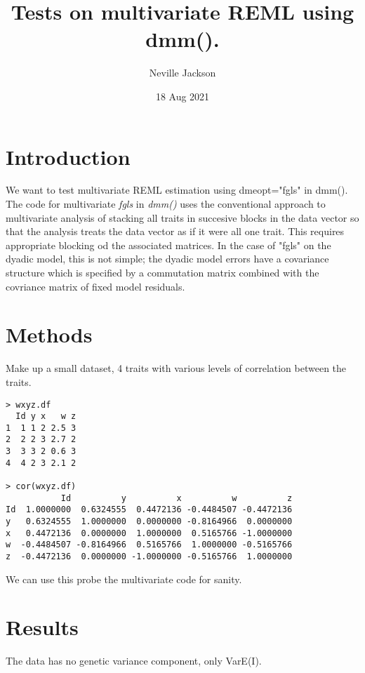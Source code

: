 \documentclass{report}  %
\title{ Tests on multivariate REML using dmm().}
\author{Neville Jackson }
\date{18 Aug 2021 }
\begin{document}
 
 
\maketitle      

\section{Introduction} 
 We want to test multivariate REML estimation using dmeopt="fgls" in dmm(). The code for multivariate {\em fgls} in {\em dmm()} uses the conventional approach to multivariate analysis of stacking all traits in succesive blocks in the data vector so that the analysis treats the data vector as if it were all one trait. This requires appropriate blocking od the associated matrices. In the case of "fgls" on the dyadic model, this is not simple; the dyadic model errors have a covariance structure which is specified by a commutation matrix combined with the  covriance matrix of fixed model residuals.

\section{Methods}
Make up a small dataset, 4 traits with various levels of correlation between the traits. 
\begin{verbatim}
> wxyz.df
  Id y x   w z
1  1 1 2 2.5 3
2  2 2 3 2.7 2
3  3 3 2 0.6 3
4  4 2 3 2.1 2

> cor(wxyz.df)
           Id          y          x          w          z
Id  1.0000000  0.6324555  0.4472136 -0.4484507 -0.4472136
y   0.6324555  1.0000000  0.0000000 -0.8164966  0.0000000
x   0.4472136  0.0000000  1.0000000  0.5165766 -1.0000000
w  -0.4484507 -0.8164966  0.5165766  1.0000000 -0.5165766
z  -0.4472136  0.0000000 -1.0000000 -0.5165766  1.0000000

\end{verbatim}
We can use this probe the multivariate code for sanity.

\section{Results}
The data has no genetic variance component, only VarE(I). 
\end{document}
